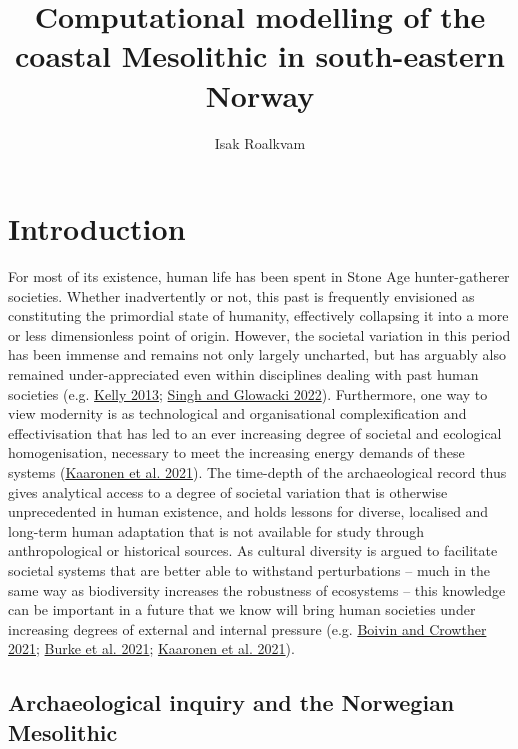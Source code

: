 \documentclass[
  12pt,
  a4paper,
  oneside]{book}
\title{Computational modelling of the coastal Mesolithic in south-eastern Norway}
\subtitle{Isak Roalkvam}
\author{Institute of Archaeology, Conservation and History \and  \and University of Oslo}
\date{}
\begin{document}
\maketitle

{
\setcounter{tocdepth}{2}
\tableofcontents
}
\mainmatter

\hypertarget{introduction}{%
\chapter{Introduction}\label{introduction}}

For most of its existence, human life has been spent in Stone Age hunter-gatherer societies. Whether inadvertently or not, this past is frequently envisioned as constituting the primordial state of humanity, effectively collapsing it into a more or less dimensionless point of origin. However, the societal variation in this period has been immense and remains not only largely uncharted, but has arguably also remained under-appreciated even within disciplines dealing with past human societies (e.g. \protect\hyperlink{ref-kelly2013}{Kelly 2013}; \protect\hyperlink{ref-singh2022}{Singh and Glowacki 2022}). Furthermore, one way to view modernity is as technological and organisational complexification and effectivisation that has led to an ever increasing degree of societal and ecological homogenisation, necessary to meet the increasing energy demands of these systems (\protect\hyperlink{ref-kaaronen2021}{Kaaronen et al. 2021}). The time-depth of the archaeological record thus gives analytical access to a degree of societal variation that is otherwise unprecedented in human existence, and holds lessons for diverse, localised and long-term human adaptation that is not available for study through anthropological or historical sources. As cultural diversity is argued to facilitate societal systems that are better able to withstand perturbations -- much in the same way as biodiversity increases the robustness of ecosystems -- this knowledge can be important in a future that we know will bring human societies under increasing degrees of external and internal pressure (e.g. \protect\hyperlink{ref-boivin2021}{Boivin and Crowther 2021}; \protect\hyperlink{ref-burke2021}{Burke et al. 2021}; \protect\hyperlink{ref-kaaronen2021}{Kaaronen et al. 2021}).

\hypertarget{archaeological-inquiry-and-the-norwegian-mesolithic}{%
\section{Archaeological inquiry and the Norwegian Mesolithic}\label{archaeological-inquiry-and-the-norwegian-mesolithic}}
\end{document}
